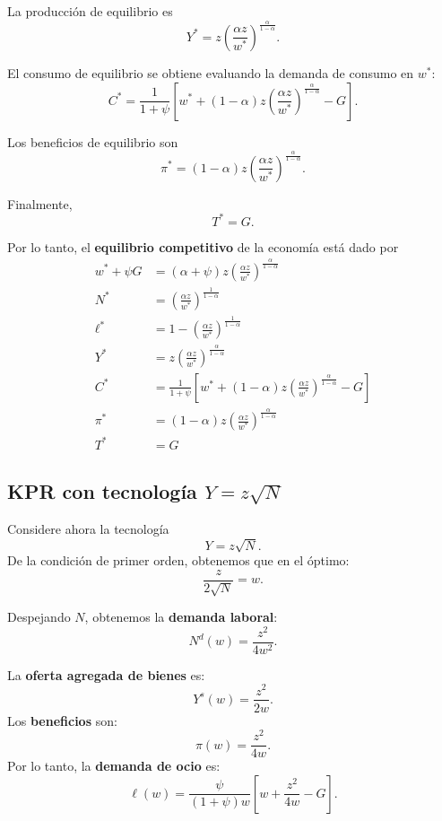 \documentclass[11pt]{article}
\begin{document}
La producción de equilibrio es
\[
\boxed{
Y^*
=
z
\left(
\frac{\alpha z}{w^*}
\right)^{\frac{\alpha}{1-\alpha}}
}.
\]

El consumo de equilibrio se obtiene evaluando la demanda de consumo en $w^*$:
\[
\boxed{
C^*
=
\frac{1}{1+\psi}
\left[
w^*
+
(1-\alpha)z
\left(
\frac{\alpha z}{w^*}
\right)^{\frac{\alpha}{1-\alpha}}
-G
\right]
}.
\]

Los beneficios de equilibrio son
\[
\boxed{
\pi^*
=
(1-\alpha)z
\left(
\frac{\alpha z}{w^*}
\right)^{\frac{\alpha}{1-\alpha}}
}.
\]

Finalmente,
\[
\boxed{
T^*=G
}.
\]

Por lo tanto, el \textbf{equilibrio competitivo} de la economía está dado por
\[
\boxed{
\begin{aligned}
w^*+\psi G
&=
(\alpha+\psi)z
\left(
\frac{\alpha z}{w^*}
\right)^{\frac{\alpha}{1-\alpha}}
\\[0.8em]
N^*
&=
\left(
\frac{\alpha z}{w^*}
\right)^{\frac{1}{1-\alpha}}
\\[0.8em]
\ell^*
&=
1-
\left(
\frac{\alpha z}{w^*}
\right)^{\frac{1}{1-\alpha}}
\\[0.8em]
Y^*
&=
z
\left(
\frac{\alpha z}{w^*}
\right)^{\frac{\alpha}{1-\alpha}}
\\[0.8em]
C^*
&=
\frac{1}{1+\psi}
\left[
w^*
+
(1-\alpha)z
\left(
\frac{\alpha z}{w^*}
\right)^{\frac{\alpha}{1-\alpha}}
-G
\right]
\\[0.8em]
\pi^*
&=
(1-\alpha)z
\left(
\frac{\alpha z}{w^*}
\right)^{\frac{\alpha}{1-\alpha}}
\\[0.8em]
T^*
&=G
\end{aligned}
}
\]


\subsection{KPR con tecnología $Y=z\sqrt{N}$}

Considere ahora la tecnología
\[
Y=z\sqrt{N}.
\]
De la condición de primer orden, obtenemos que en el óptimo:
\[
\frac{z}{2\sqrt{N}}=w.
\]

Despejando $N$, obtenemos la \textbf{demanda laboral}:
\[
\boxed{
N^d(w)=\frac{z^2}{4w^2}
}.
\]

La \textbf{oferta agregada de bienes} es:
\[
\boxed{
Y^s(w)=\frac{z^2}{2w}
}.
\]
Los \textbf{beneficios} son:
\[
\boxed{
\pi(w)=\frac{z^2}{4w}
}.
\]
Por lo tanto, la \textbf{demanda de ocio} es:
\[
\boxed{
\ell(w)
=
\frac{\psi}{(1+\psi)w}
\left[
w+\frac{z^2}{4w}-G
\right]
}.
\]
\end{document}
